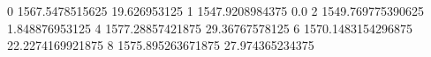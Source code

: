 0 1567.5478515625 19.626953125
1 1547.9208984375 0.0
2 1549.769775390625 1.848876953125
4 1577.28857421875 29.36767578125
6 1570.1483154296875 22.2274169921875
8 1575.895263671875 27.974365234375
